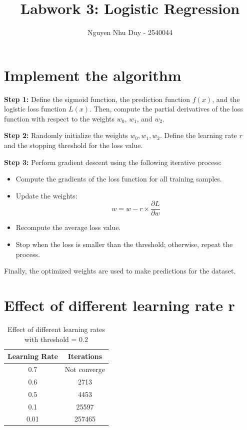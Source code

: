 \documentclass{article}
\title{Labwork 3: Logistic Regression}
\author{Nguyen Nhu Duy - 2540044}
\begin{document}
\setlength{\parindent}{0pt}
\maketitle
\section{Implement the algorithm}
\textbf{Step 1:} Define the sigmoid function, the prediction function \(f(x)\), and the logistic loss function \(L(x)\). Then, compute the partial derivatives of the loss function with respect to the weights \(w_0\), \(w_1\), and \(w_2\).

\textbf{Step 2:} Randomly initialize the weights \(w_0, w_1, w_2\). Define the learning rate \(r\) and the stopping threshold for the loss value.

\textbf{Step 3:} Perform gradient descent using the following iterative process:

\begin{itemize}
    \item Compute the gradients of the loss function for all training samples.
    
    \item Update the weights:
    \[
    w = w - r \times \frac{\partial L}{\partial w}
    \]
    
    \item Recompute the average loss value.
    
    \item Stop when the loss is smaller than the threshold; otherwise, repeat the process.
\end{itemize}

Finally, the optimized weights are used to make predictions for the dataset.

\section{Effect of different learning rate r}

\begin{table}[h]
\centering
\begin{tabular}{|c|c|}
\hline
Learning Rate & Iterations  \\
\hline
0.7 & Not converge \\
0.6 & 2713 \\
0.5 & 4453 \\
0.1 & 25597  \\
0.01 & 257465 \\
\hline
\end{tabular}
\caption{Effect of different learning rates with threshold = 0.2}
\end{table}
\end{document}
